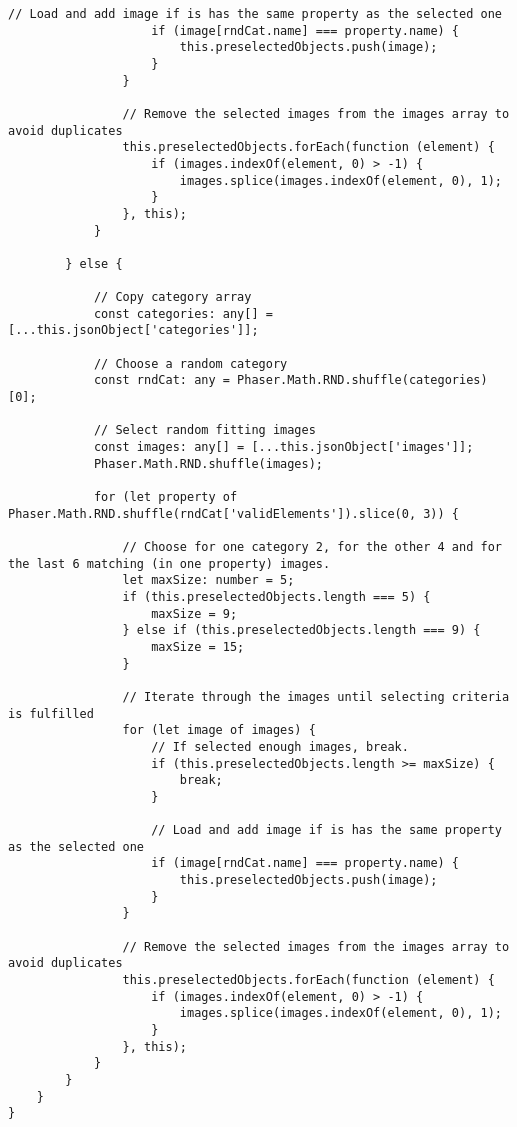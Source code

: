 \begin{lstlisting}[style=TypeScript, caption={restrictedSortingScene.ts}]
                    // Load and add image if is has the same property as the selected one
                    if (image[rndCat.name] === property.name) {
                        this.preselectedObjects.push(image);
                    }
                }

                // Remove the selected images from the images array to avoid duplicates
                this.preselectedObjects.forEach(function (element) {
                    if (images.indexOf(element, 0) > -1) {
                        images.splice(images.indexOf(element, 0), 1);
                    }
                }, this);
            }

        } else {

            // Copy category array
            const categories: any[] = [...this.jsonObject['categories']];

            // Choose a random category
            const rndCat: any = Phaser.Math.RND.shuffle(categories)[0];

            // Select random fitting images
            const images: any[] = [...this.jsonObject['images']];
            Phaser.Math.RND.shuffle(images);

            for (let property of Phaser.Math.RND.shuffle(rndCat['validElements']).slice(0, 3)) {

                // Choose for one category 2, for the other 4 and for the last 6 matching (in one property) images.
                let maxSize: number = 5;
                if (this.preselectedObjects.length === 5) {
                    maxSize = 9;
                } else if (this.preselectedObjects.length === 9) {
                    maxSize = 15;
                }

                // Iterate through the images until selecting criteria is fulfilled
                for (let image of images) {
                    // If selected enough images, break.
                    if (this.preselectedObjects.length >= maxSize) {
                        break;
                    }

                    // Load and add image if is has the same property as the selected one
                    if (image[rndCat.name] === property.name) {
                        this.preselectedObjects.push(image);
                    }
                }

                // Remove the selected images from the images array to avoid duplicates
                this.preselectedObjects.forEach(function (element) {
                    if (images.indexOf(element, 0) > -1) {
                        images.splice(images.indexOf(element, 0), 1);
                    }
                }, this);
            }
        }
    }
}
\end{lstlisting}

